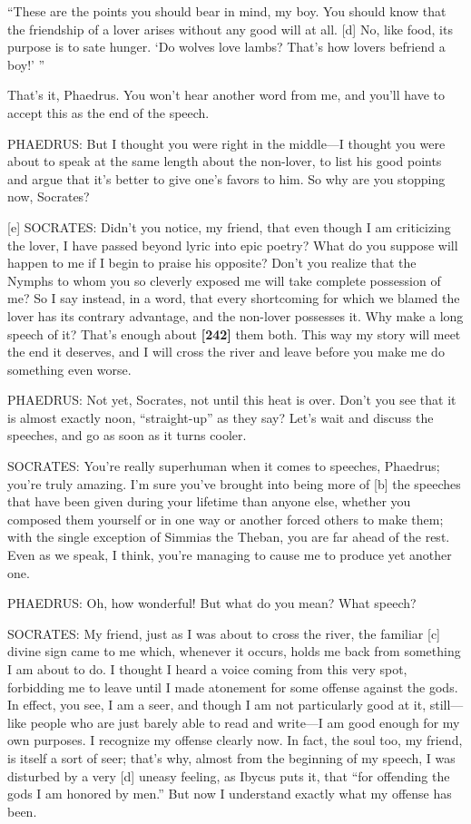 “These are the points you should bear in mind, my boy. You should know
that the friendship of a lover arises without any good will at all.
{[}d{]} No, like food, its purpose is to sate hunger. ‘Do wolves love
lambs? That's how lovers befriend a boy!' ”

That's it, Phaedrus. You won't hear another word from me, and you'll
have to accept this as the end of the speech.

PHAEDRUS: But I thought you were right in the middle---I thought you
were about to speak at the same length about the non-lover, to list his
good points and argue that it's better to give one's favors to him. So
why are you stopping now, Socrates?

{[}e{]} SOCRATES: Didn't you notice, my friend, that even though I am
criticizing the lover, I have passed beyond lyric into epic
poetry? What do you
suppose will happen to me if I begin to praise his opposite? Don't you
realize that the Nymphs to whom you so cleverly exposed me will take
complete possession of me? So I say instead, in a word, that every
shortcoming for which we blamed the lover has its contrary advantage,
and the non-lover possesses it. Why make a long speech of it? That's
enough about {\bf {[}242{]}} them both. This way my story will meet the
end it deserves, and I will cross the river and leave before you make me
do something even worse.

PHAEDRUS: Not yet, Socrates, not until this heat is over. Don't you see
that it is almost exactly noon, “straight-up” as they say? Let's wait
and discuss the speeches, and go as soon as it turns cooler.

SOCRATES: You're really superhuman when it comes to speeches, Phaedrus;
you're truly amazing. I'm sure you've brought into being more of {[}b{]}
the speeches that have been given during your lifetime than anyone else,
whether you composed them yourself or in one way or another forced
others to make them; with the single exception of Simmias the Theban,
you are far ahead of the
rest. Even as we
speak, I think, you're managing to cause me to produce yet another one.

PHAEDRUS: Oh, how wonderful! But what do you mean? What speech?

SOCRATES: My friend, just as I was about to cross the river, the
familiar {[}c{]} divine sign came to me which, whenever it occurs, holds
me back from something I am about to do. I thought I heard a voice
coming from this very spot, forbidding me to leave until I made
atonement for some offense against the gods. In effect, you see, I am a
seer, and though I am not particularly good at it, still---like people
who are just barely able to read and write---I am good enough for my own
purposes. I recognize my offense clearly now. In fact, the soul too, my
friend, is itself a sort of seer; that's why, almost from the beginning
of my speech, I was disturbed by a very {[}d{]} uneasy feeling, as
Ibycus puts it, that “for offending the gods I am honored by
men.” But now I
understand exactly what my offense has been.

